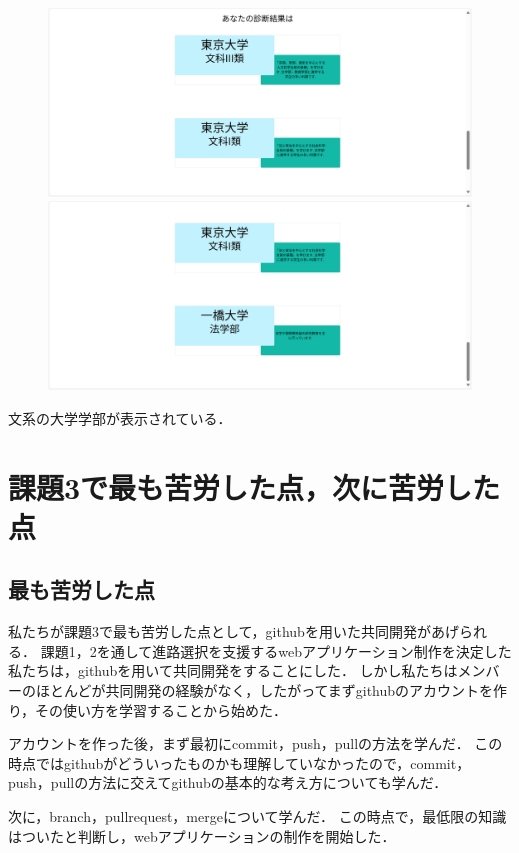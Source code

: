 \documentclass[a4j, titlepage]{jarticle}
\begin{document}
\begin{figure}[h]
  \centering
\includegraphics[scale=0.20]{dousakekka-12.png}
\includegraphics[scale=0.20]{dousakekka-13.png}
\end{figure}

文系の大学学部が表示されている．

\section{課題3で最も苦労した点，次に苦労した点}
\subsection{最も苦労した点}

私たちが課題3で最も苦労した点として，githubを用いた共同開発があげられる．
課題1，2を通して進路選択を支援するwebアプリケーション制作を決定した私たちは，githubを用いて共同開発をすることにした．
しかし私たちはメンバーのほとんどが共同開発の経験がなく，したがってまずgithubのアカウントを作り，その使い方を学習することから始めた．

アカウントを作った後，まず最初にcommit，push，pullの方法を学んだ．
この時点ではgithubがどういったものかも理解していなかったので，commit，push，pullの方法に交えてgithubの基本的な考え方についても学んだ．

次に，branch，pullrequest，mergeについて学んだ．
この時点で，最低限の知識はついたと判断し，webアプリケーションの制作を開始した．
\end{document}
